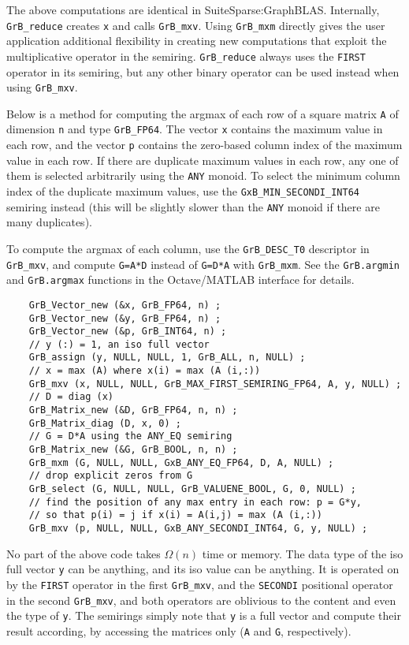 \documentclass[12pt]{article}
\begin{document}
The above computations are identical in SuiteSparse:GraphBLAS.  Internally,
\verb'GrB_reduce' creates \verb'x' and calls \verb'GrB_mxv'.  Using
\verb'GrB_mxm' directly gives the user application additional flexibility in
creating new computations that exploit the multiplicative operator in the
semiring.  \verb'GrB_reduce' always uses the \verb'FIRST' operator in its
semiring, but any other binary operator can be used instead when using
\verb'GrB_mxv'.

Below is a method for computing the argmax of each row of a square matrix
\verb'A' of dimension \verb'n' and type \verb'GrB_FP64'.  The vector \verb'x'
contains the maximum value in each row, and the vector \verb'p' contains the
zero-based column index of the maximum value in each row.  If there are
duplicate maximum values in each row, any one of them is selected arbitrarily
using the \verb'ANY' monoid.  To select the minimum column index of the
duplicate maximum values, use the \verb'GxB_MIN_SECONDI_INT64' semiring instead
(this will be slightly slower than the \verb'ANY' monoid if there are many
duplicates).

To compute the argmax of each column, use the \verb'GrB_DESC_T0' descriptor
in \verb'GrB_mxv', and compute \verb'G=A*D' instead of \verb'G=D*A' with
\verb'GrB_mxm'.  See the \verb'GrB.argmin' and \verb'GrB.argmax' functions
in the Octave/MATLAB interface for details.


{\footnotesize
\begin{verbatim}
    GrB_Vector_new (&x, GrB_FP64, n) ;
    GrB_Vector_new (&y, GrB_FP64, n) ;
    GrB_Vector_new (&p, GrB_INT64, n) ;
    // y (:) = 1, an iso full vector
    GrB_assign (y, NULL, NULL, 1, GrB_ALL, n, NULL) ;
    // x = max (A) where x(i) = max (A (i,:))
    GrB_mxv (x, NULL, NULL, GrB_MAX_FIRST_SEMIRING_FP64, A, y, NULL) ;
    // D = diag (x)
    GrB_Matrix_new (&D, GrB_FP64, n, n) ;
    GrB_Matrix_diag (D, x, 0) ;
    // G = D*A using the ANY_EQ semiring
    GrB_Matrix_new (&G, GrB_BOOL, n, n) ;
    GrB_mxm (G, NULL, NULL, GxB_ANY_EQ_FP64, D, A, NULL) ;
    // drop explicit zeros from G
    GrB_select (G, NULL, NULL, GrB_VALUENE_BOOL, G, 0, NULL) ;
    // find the position of any max entry in each row: p = G*y,
    // so that p(i) = j if x(i) = A(i,j) = max (A (i,:))
    GrB_mxv (p, NULL, NULL, GxB_ANY_SECONDI_INT64, G, y, NULL) ; \end{verbatim}}

No part of the above code takes $\Omega(n)$ time or memory.  The data type of
the iso full vector \verb'y' can be anything, and its iso value can be
anything.  It is operated on by the \verb'FIRST' operator in the first
\verb'GrB_mxv', and the \verb'SECONDI' positional operator in the second
\verb'GrB_mxv', and both operators are oblivious to the content and even the
type of \verb'y'.  The semirings simply note that \verb'y' is a full vector and
compute their result according, by accessing the matrices only (\verb'A' and
\verb'G', respectively).
\end{document}
